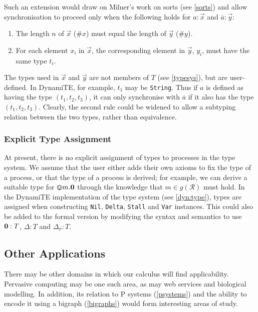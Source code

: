 Such an extension would draw on Milner's work on sorts (see
\ref{sorts}) and allow synchronisation to proceed only when the
following holds for $a : \vec{x}$ and $\overline{a} : \vec{y}$:

\begin{enumerate}
\item The length $n$ of $\vec{x}$ ($\#x$) must equal the length of
  $\vec{y}$ ($\#y$).
\item For each element $x_i$ in $\vec{x}$, the corresponding element
  in $\vec{y}$, $y_i$, must have the same type $t_i$.
\end{enumerate}

The types used in $\vec{x}$ and $\vec{y}$ are not members of $T$ (see
\ref{typesys}), but are user-defined.  In DynamiTE, for example, $t_1$
may be \texttt{String}.  Thus if $a$ is defined as having the type
$(t_1, t_2, t_3)$, it can only synchronise with $\overline{a}$ if it
also has the type $(t_1, t_2, t_3)$.  Clearly, the second rule could
be widened to allow a subtyping relation between the two types, rather
than equivalence.

\subsubsection{Explicit Type Assignment}

At present, there is no explicit assignment of types to processes in
the type system.  We assume that the user either adds their own axioms
to fix the type of a process, or that the type of a process is
derived; for example, we can derive a suitable type for
$\varovee m.\textbf{0}$ through the knowledge that $m \in g(\mathscr{R})$
must hold.  In the DynamiTE implementation of the type system (see
\ref{dyn:type}), types are assigned when constructing \texttt{Nil},
\texttt{Delta}, \texttt{Stall} and \texttt{Var} instances.  This could
also be added to the formal version by modifying the syntax and
semantics to use $\textbf{0} : T$, $\Delta : T$ and $\Delta_\sigma : T$.

\subsection{Other Applications}
\label{future:apps}

There may be other domains in which our calculus will find
applicability.  Pervasive computing may be one such area, as may web
services and biological modelling.  In addition, its relation to P
systems (\ref{psystems}) and the ability to encode it using a bigraph
(\ref{bigraphs}) would form interesting areas of study.

